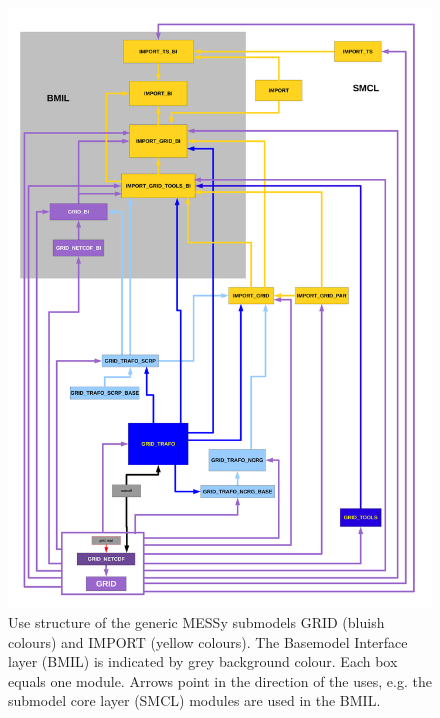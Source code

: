 \documentclass[11pt,twoside]{report}
\begin{document}
\begin{figure}[t]
\vspace*{-.7cm}
\begin{center}
\includegraphics[height=0.87\textheight]{USEd_IMPORT.pdf}
\end{center}
\vspace*{-.5cm}
\caption{Use structure of the generic MESSy submodels GRID (bluish
colours) and IMPORT (yellow colours). The Basemodel Interface layer
(BMIL) is indicated by grey background colour. Each box equals one
module. Arrows point in the direction of the uses, e.g. the submodel
core layer (SMCL) modules are used in the BMIL. \label{USE}} 
\end{figure}
\end{document}
